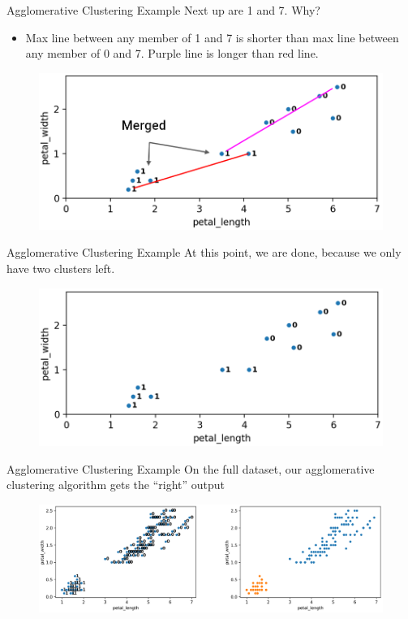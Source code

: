 \documentclass[aspectratio=169]{../latex_main/tntbeamer}  %
\begin{document}
	\begin{frame}{Agglomerative Clustering Example}
	    Next up are 1 and 7. Why?
	    \begin{itemize}
	        \item Max line between any member of 1 and 7 is shorter than max line between any member of 0 and 7. Purple line is longer than red line.
	    \end{itemize}
	    \begin{figure}
	        \centering
	        \includegraphics[scale=.35]{Bild49}
	    \end{figure}
	\end{frame}
	
	
	\begin{frame}{Agglomerative Clustering Example}
	    At this point, we are done, because we only have two clusters left.
	    \begin{figure}
	        \centering
	        \includegraphics[scale=.35]{Bild50}
	    \end{figure}
	\end{frame}
	
	
	
	\begin{frame}{Agglomerative Clustering Example}
	    On the full dataset, our agglomerative clustering algorithm gets the “right” output
	    \begin{figure}
	        \centering
	        \includegraphics[scale=.35]{Bild51}
	    \end{figure}
	\end{frame}
	
\end{document}
